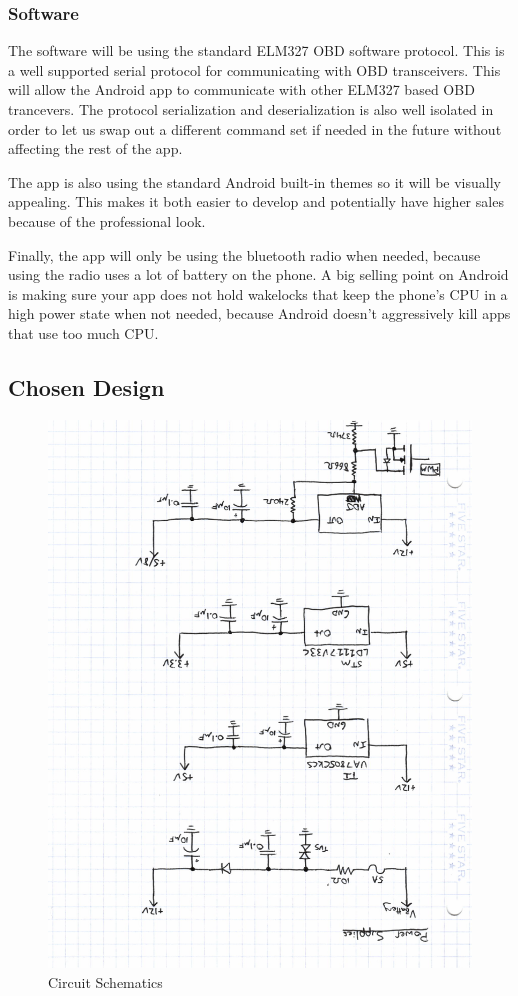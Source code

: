 \documentclass[12pt,letterpaper]{article}
\begin{document}
\subsubsection{Software}
The software will be using the standard ELM327 OBD software protocol. This is a well supported serial protocol for communicating with OBD transceivers. This will allow the Android app to communicate with other ELM327 based OBD trancevers. The protocol serialization and deserialization is also well isolated in order to let us swap out a different command set if needed in the future without affecting the rest of the app. 


The app is also using the standard Android built-in themes so it will be visually appealing. This makes it both easier to develop and potentially have higher sales because of the professional look. 

Finally, the app will only be using the bluetooth radio when needed, because using the radio uses a lot of battery on the phone. A big selling point on Android is making sure your app does not hold wakelocks that keep the phone's CPU in a high power state when not needed, because Android doesn't aggressively kill apps that use too much CPU.
\subsection{Chosen Design}
\begin{figure}[H]
\centering
\includegraphics[page=1, totalheight=20cm, angle=180]{images/circuit_sch.pdf}
\caption{Circuit Schematics}
\label{fig: image}
\end{figure}
\end{document}
